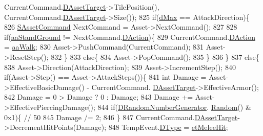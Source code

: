 \begin{DoxyCode}
      CurrentCommand.\hyperlink{structSAssetCommand_a3d9b43f6e59c386c48c41a65448a0c39}{DAssetTarget}->TilePosition(), CurrentCommand.\hyperlink{structSAssetCommand_a3d9b43f6e59c386c48c41a65448a0c39}{DAssetTarget}->Size());
825                     \textcolor{keywordflow}{if}(\hyperlink{GameDataTypes_8h_acb2b033915f6659a71a38b5aa6e4eb42af6546049275557ce0ade2ceee042a319}{dMax} == AttackDirection)\{
826                         \hyperlink{structSAssetCommand}{SAssetCommand} NextCommand = Asset->NextCommand();
827                         
828                         \textcolor{keywordflow}{if}(\hyperlink{GameDataTypes_8h_ab47668e651a3032cfb9c40ea2d60d670abd8a4e07a8f888148ed62ddd46719af3}{aaStandGround} != NextCommand.\hyperlink{structSAssetCommand_a8edd3b3d59a76d5514ba403bc8076a75}{DAction})\{
829                             CurrentCommand.\hyperlink{structSAssetCommand_a8edd3b3d59a76d5514ba403bc8076a75}{DAction} = \hyperlink{GameDataTypes_8h_ab47668e651a3032cfb9c40ea2d60d670a60ca9010aa62b73c1aab838ff4bf7276}{aaWalk};
830                             Asset->PushCommand(CurrentCommand);
831                             Asset->ResetStep();
832                         \}
833                         \textcolor{keywordflow}{else}\{
834                             Asset->PopCommand();      
835                         \}
836                     \}
837                     \textcolor{keywordflow}{else}\{
838                         Asset->Direction(AttackDirection);
839                         Asset->IncrementStep();
840                         \textcolor{keywordflow}{if}(Asset->Step() == Asset->AttackSteps())\{
841                             \textcolor{keywordtype}{int} Damage = Asset->EffectiveBasicDamage() - CurrentCommand.
      \hyperlink{structSAssetCommand_a3d9b43f6e59c386c48c41a65448a0c39}{DAssetTarget}->EffectiveArmor();
842                             Damage = 0 > Damage ? 0 : Damage;
843                             Damage += Asset->EffectivePiercingDamage();
844                             \textcolor{keywordflow}{if}(\hyperlink{classCGameModel_a3fb9b6b40f397c022087f381f63954b9}{DRandomNumberGenerator}.
      \hyperlink{classCRandomNumberGenerator_aa7fc51bde5647d15df2f1b9826702ca2}{Random}() & 0x1)\{ \textcolor{comment}{// 50%
845                                 Damage /= 2;
846                             \}
847                             CurrentCommand.\hyperlink{structSAssetCommand_a3d9b43f6e59c386c48c41a65448a0c39}{DAssetTarget}->DecrementHitPoints(Damage);
848                             TempEvent.\hyperlink{structSGameEvent_afa10562e243f4ac2b473b655cc58fee7}{DType} = \hyperlink{GameModel_8h_abfcf510bafec7c6429906a6ecaac656da8d8f64940a6b0bbc74f7e75a0e9e6e70}{etMeleeHit};
}
\end{DoxyCode}
